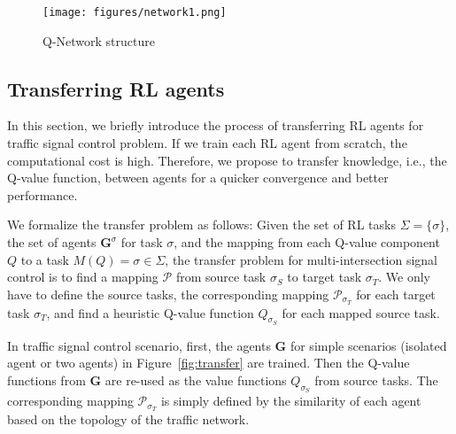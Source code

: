 \begin{figure}[h!]
  \centering
   \texttt{[image: figures/network1.png]}
    \caption{Q-Network structure}
   \label{fig:q-network}
\end{figure}

\subsection{Transferring RL agents}
In this section, we briefly introduce the process of transferring RL agents for traffic signal control problem. If we train each RL agent from scratch, the computational cost is high. Therefore, we propose to transfer knowledge, i.e., the Q-value function, between agents for a quicker convergence and better performance. 


We formalize the transfer problem as follows: Given the set of RL tasks $\Sigma=\{\sigma\}$, the set of agents $\pmb{G}^\sigma$ for task $\sigma$, and the mapping from each Q-value component $Q$ to a task $M(Q)=\sigma\in\Sigma$, the transfer problem for multi-intersection signal control is to find a mapping $\mathcal{P}$ from source task $\sigma_S$ to target task $\sigma_T$. We only have to define the source tasks, the corresponding mapping $\mathcal{P}_{\sigma_T}$ for each target task $\sigma_T$, and find a heuristic Q-value function $Q_{\sigma_S}$ for each mapped source task.

In traffic signal control scenario, first, the agents $\pmb{G}$ for simple scenarios (isolated agent or two agents) in Figure~\ref{fig:transfer} are trained. Then the Q-value functions from $\pmb{G}$ are re-used as the value functions $Q_{\sigma_S}$ from source tasks. The corresponding mapping $\mathcal{P}_{\sigma_T}$ is simply defined by the similarity of each agent based on the topology of the traffic network. 

